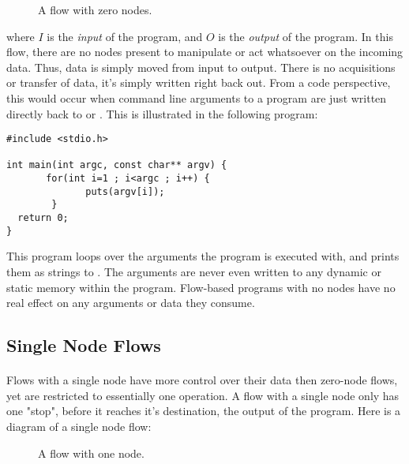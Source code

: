 \begin{figure}[h]
\centering
{}
\caption{A flow with zero nodes.}
\end{figure}

where $I$ is the \emph{input} of the program, and $O$ is the \emph{output} of the program. In this flow, there are no nodes present to manipulate or act whatsoever on the incoming data. Thus, data is simply moved from input to output. There is no acquisitions or transfer of data, it's simply written right back out. From a code perspective, this would occur when command line arguments to a program are just written directly back to  or . This is illustrated in the following program:

\begin{lstlisting}[style=numc]
#include <stdio.h>

int main(int argc, const char** argv) {
       for(int i=1 ; i<argc ; i++) {
              puts(argv[i]);
        }
  return 0;
}
\end{lstlisting}

\par This program loops over the arguments the program is executed with, and prints them as strings to . The arguments are never even written to any dynamic or static memory within the program. Flow-based programs with no nodes have no real effect on any arguments or data they consume.

\subsection{Single Node Flows}

\paragraph{  } Flows with a single node have more control over their data then zero-node flows, yet are restricted to essentially one operation. A flow with a single node only has one "stop", before it reaches it's destination, the output of the program. Here is a diagram of a single node flow:

\begin{figure}[h]
\centering
{}
\caption{A flow with one node.}
\end{figure}

